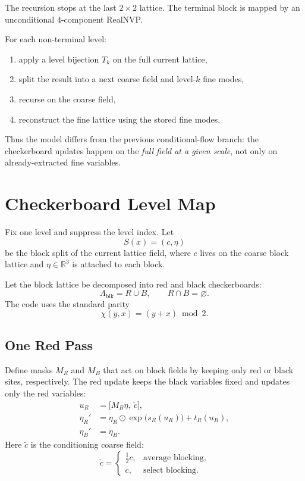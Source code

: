 \documentclass[11pt]{article}
\begin{document}
The recursion stops at the last $2\times 2$ lattice. The terminal block is
mapped by an unconditional $4$-component RealNVP.

For each non-terminal level:
\begin{enumerate}
\item apply a level bijection $T_k$ on the full current lattice,
\item split the result into a next coarse field and level-$k$ fine modes,
\item recurse on the coarse field,
\item reconstruct the fine lattice using the stored fine modes.
\end{enumerate}

Thus the model differs from the previous conditional-flow branch: the
checkerboard updates happen on the \emph{full field at a given scale}, not only
on already-extracted fine variables.

\section{Checkerboard Level Map}

Fix one level and suppress the level index. Let
\[
S(x) = (c,\eta)
\]
be the block split of the current lattice field, where $c$ lives on the coarse
block lattice and $\eta\in\mathbb{R}^3$ is attached to each block.

Let the block lattice be decomposed into red and black checkerboards:
\[
\Lambda_{\mathrm{blk}} = R \cup B,
\qquad
R\cap B = \varnothing.
\]
The code uses the standard parity
\[
\chi(y,x) = (y+x)\bmod 2.
\]

\subsection{One Red Pass}

Define masks $M_R$ and $M_B$ that act on block fields by keeping only red or
black sites, respectively. The red update keeps the black variables fixed and
updates only the red variables:
\begin{align}
u_R &= \bigl[M_B\eta,\ \tilde c\bigr], \\
\eta_R' &= \eta_R \odot \exp\bigl(s_R(u_R)\bigr) + t_R(u_R), \\
\eta_B' &= \eta_B.
\end{align}
Here $\tilde c$ is the conditioning coarse field:
\[
\tilde c =
\begin{cases}
\tfrac12 c,& \text{average blocking,} \\
c,& \text{select blocking.}
\end{cases}
\]
\end{document}

